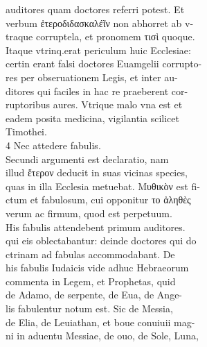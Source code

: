 \documentclass{article}
\begin{document}
\begin{pages}
                auditores quam doctores referri potest. Et \\
                verbum ἐτεροδιδασκαλέῖν non abhorret ab v- \\
                traque corruptela, et pronomem τισὶ quoque. \\
                Itaque vtrinq.erat periculum huic Ecclesiae: \\
                certin erant falsi doctores Euamgelii corrupto- \\
                res per obseruationem Legis, et inter au- \\
                ditores qui faciles in hac re praeberent cor- \\
                ruptoribus aures. Vtrique malo vna est et \\
                eadem posita medicina, vigilantia scilicet \\
                Timothei. \\
                4 Nec attedere fabulis. \\
                Secundi argumenti est declaratio, nam \\
                illud ἕτερον deducit in suas vicinas species, \\
                quas in illa Ecclesia metuebat. Μυθικὸν est fi- \\
                ctum et fabulosum, cui opponitur το ἀληθὲς \\
                verum ac firmum, quod est perpetuum. \\
                His fabulis attendebent primum auditores. \\
                qui eis oblectabantur: deinde doctores qui do \\
                ctrinam ad fabulas accommodabant. De \\
                his fabulis Iudaicis vide adhuc Hebraeorum \\
                commenta in Legem, et Prophetas, quid \\
                de Adamo, de serpente, de Eua, de Ange- \\
                lis fabulentur notum est. Sic de Messia, \\
                de Elia, de Leuiathan, et boue conuiuii mag- \\
                ni in aduentu Messiae, de ouo, de Sole, Luna, \\

\end{pages}
\end{document}
